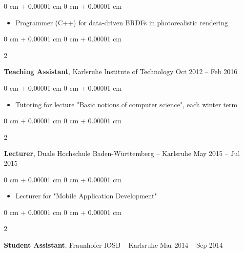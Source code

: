 \documentclass[10pt, letterpaper]{article}
\newenvironment{highlights}{
    \begin{itemize}[
        topsep=0.10 cm,
        parsep=0.10 cm,
        partopsep=0pt,
        itemsep=0pt,
        leftmargin=0 cm + 10pt
    ]
}{
    \end{itemize}
} %
\newenvironment{onecolentry}{
    \begin{adjustwidth}{
        0 cm + 0.00001 cm
    }{
        0 cm + 0.00001 cm
    }
}{
    \end{adjustwidth}
} %
\newenvironment{twocolentry}[2][]{
    \onecolentry
    \def\secondColumn{#2}
    \setcolumnwidth{\fill, 4.5 cm}
    \begin{paracol}{2}
}{
    \switchcolumn \raggedleft \secondColumn
    \end{paracol}
    \endonecolentry
} %
\begin{document}
        \vspace{0.10 cm}
        \begin{onecolentry}
            \begin{highlights}
                \item Programmer (C++) for data-driven BRDFs in photorealistic rendering
            \end{highlights}
        \end{onecolentry}


        \expspace

        \begin{twocolentry}{
            Oct 2012 – Feb 2016
        }
            \textbf{Teaching Assistant}, Karlsruhe Institute of Technology\end{twocolentry}

        \vspace{0.10 cm}
        \begin{onecolentry}
            \begin{highlights}
                \item Tutoring for lecture "Basic notions of computer science", each winter term
            \end{highlights}
        \end{onecolentry}


        \expspace

        \begin{twocolentry}{
            May 2015 – Jul 2015
        }
            \textbf{Lecturer}, Duale Hochschule Baden-Württemberg -- Karlsruhe\end{twocolentry}

        \vspace{0.10 cm}
        \begin{onecolentry}
            \begin{highlights}
                \item Lecturer for "Mobile Application Development"
            \end{highlights}
        \end{onecolentry}

        \expspace

        \begin{twocolentry}{
            Mar 2014 – Sep 2014
        }
            \textbf{Student Assistant}, Fraunhofer IOSB -- Karlsruhe\end{twocolentry}
\end{document}
